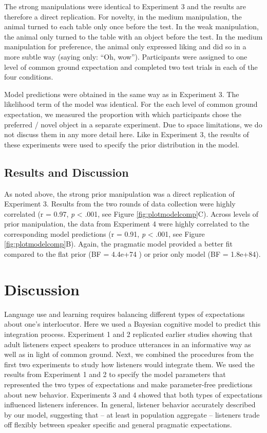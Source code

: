 \documentclass[10pt, letterpaper]{article}
\begin{document}
The strong manipulations were identical to Experiment 3 and the results
are therefore a direct replication. For novelty, in the medium
manipulation, the animal turned to each table only once before the test.
In the weak manipulation, the animal only turned to the table with an
object before the test. In the medium manipulation for preference, the
animal only expressed liking and did so in a more subtle way (saying
only: ``Oh, wow''). Participants were assigned to one level of common
ground expectation and completed two test trials in each of the four
conditions.

Model predictions were obtained in the same way as in Experiment 3. The
likelihood term of the model was identical. For the each level of common
ground expectation, we measured the proportion with which participants
chose the preferred / novel object in a separate experiment. Due to
space limitations, we do not discuss them in any more detail here. Like
in Experiment 3, the results of these experiments were used to specify
the prior distribution in the model.

\subsection{Results and Discussion}\label{results-and-discussion-3}

As noted above, the strong prior manipulation was a direct replication
of Experiment 3. Results from the two rounds of data collection were
highly correlated (r = 0.97, \emph{p} \textless{} .001, see Figure
\ref{fig:plotmodelcomp}C). Across levels of prior manipulation, the data
from Experiment 4 were highly correlated to the corresponding model
predictions (r = 0.91, \emph{p} \textless{} .001, see Figure
\ref{fig:plotmodelcomp}B). Again, the pragmatic model provided a better
fit compared to the flat prior (BF = 4.4e+74 ) or prior only model (BF =
1.8e+84).

\section{Discussion}\label{discussion}

Language use and learning requires balancing different types of
expectations about one's interlocutor. Here we used a Bayesian cognitive
model to predict this integration process. Experiment 1 and 2 replicated
earlier studies showing that adult listeners expect speakers to produce
utterances in an informative way as well as in light of common ground.
Next, we combined the procedures from the first two experiments to study
how listeners would integrate them. We used the results from Experiment
1 and 2 to specify the model parameters that represented the two types
of expectations and make parameter-free predictions about new behavior.
Experiments 3 and 4 showed that both types of expectations influenced
listeners inferences. In general, listener behavior accurately described
by our model, suggesting that -- at least in population aggregate --
listeners trade off flexibly between speaker specific and general
pragmatic expectations.
\end{document}
